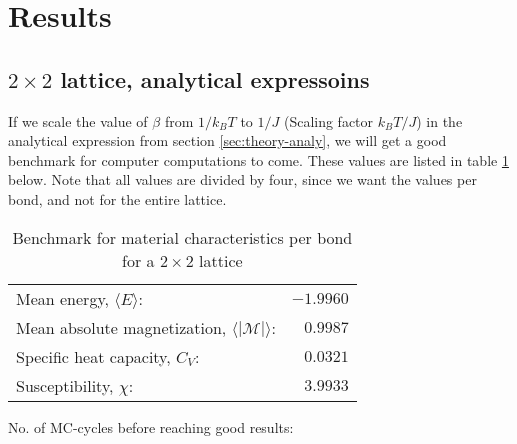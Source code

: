 \documentclass[../main.tex]{subfiles}
\begin{document}
\section{Results}
\subsection{$2 \times 2$ lattice, analytical expressoins}
If we scale the value of $\beta$ from $1/k_BT$ to $1/J$ (Scaling factor $k_B T/J$) in the analytical expression from section \ref{sec:theory-analy}, we will get a good benchmark for computer computations to come. These values are listed in table \ref{tab:2x2spinsEnergiesMags} below. Note that all values are divided by four, since we want the values per bond, and not for the entire lattice.
\begin{table}[!h]
\begin{center}
  \begin{tabular}{l r}
    Mean energy, $\langle E \rangle$: & $-1.9960$  \\
    Mean absolute magnetization, $\langle |\mathcal{M}| \rangle$: & $0.9987$ \\
    Specific heat capacity, $C_V$: & $0.0321$\\
    Susceptibility, $\chi$: & $3.9933$
  \end{tabular}
  \caption{Benchmark for material characteristics per bond for a $2 \times 2$ lattice}
  \label{tab:2x2spinsEnergiesMags}
\end{center}
\end{table}
\FloatBarrier

No. of MC-cycles before reaching good results:
\end{document}
